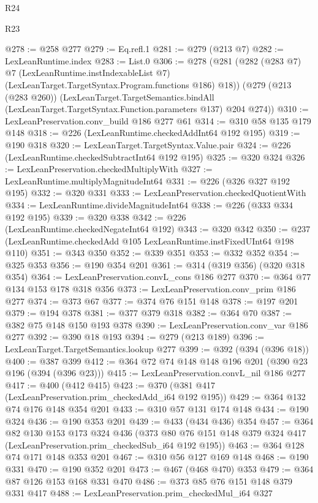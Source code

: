 \begin{lexlean}{R24}
\begin{lexlean}{R23}
\begin{coremodule}
{{{{{@278 := @258 @277
@279 := Eq.refl.{1}
@281 := @279 (@213 @7)
@282 := LexLeanRuntime.index
@283 := List.{0}
@306 := @278
    (@281
      (@282
        (@283 @7)
        @7
        (LexLeanRuntime.instIndexableList @7)
        (LexLeanTarget.TargetSyntax.Program.functions @186)
        @18))
    (@279
      (@213 (@283 @260))
      (LexLeanTarget.TargetSemantics.bindAll
        (LexLeanTarget.TargetSyntax.Function.parameters @137)
        @204
        @274))
@310 := LexLeanPreservation.conv_build @186 @277 @61
@314 := @310 @58 @135 @179 @148
@318 := @226 (LexLeanRuntime.checkedAddInt64 @192 @195)
@319 := @190 @318
@320 := LexLeanTarget.TargetSyntax.Value.pair
@324 := @226 (LexLeanRuntime.checkedSubtractInt64 @192 @195)
@325 := @320 @324
@326 := LexLeanPreservation.checkedMultiplyWith
@327 := LexLeanRuntime.multiplyMagnitudeInt64
@331 := @226 (@326 @327 @192 @195)
@332 := @320 @331
@333 := LexLeanPreservation.checkedQuotientWith
@334 := LexLeanRuntime.divideMagnitudeInt64
@338 := @226 (@333 @334 @192 @195)
@339 := @320 @338
@342 := @226 (LexLeanRuntime.checkedNegateInt64 @192)
@343 := @320 @342
@350 := @237 (LexLeanRuntime.checkedAdd @105 LexLeanRuntime.instFixedUInt64 @198 @110)
@351 := @343 @350
@352 := @339 @351
@353 := @332 @352
@354 := @325 @353
@356 := @190 @354 @201
@361 := @314 (@319 @356) (@320 @318 @354)
@364 := LexLeanPreservation.convL_cons @186 @277
@370 := @364 @77 @134 @153 @178 @318 @356
@373 := LexLeanPreservation.conv_prim @186 @277
@374 := @373 @67
@377 := @374 @76 @151 @148
@378 := @197 @201
@379 := @194 @378
@381 := @377 @379 @318
@382 := @364 @70
@387 := @382 @75 @148 @150 @193 @378
@390 := LexLeanPreservation.conv_var @186 @277
@392 := @390 @18 @193
@394 := @279 (@213 @189)
@396 := LexLeanTarget.TargetSemantics.lookup @277
@399 := @392 (@394 (@396 @18))
@400 := @387 @399
@412 := @364 @72 @74 @148 @148 @196 @201 (@390 @23 @196 (@394 (@396 @23)))
@415 := LexLeanPreservation.convL_nil @186 @277
@417 := @400 (@412 @415)
@423 := @370 (@381 @417 (LexLeanPreservation.prim_checkedAdd_i64 @192 @195))
@429 := @364 @132 @74 @176 @148 @354 @201
@433 := @310 @57 @131 @174 @148
@434 := @190 @324
@436 := @190 @353 @201
@439 := @433 (@434 @436) @354
@457 := @364
    @82
    @130
    @153
    @173
    @324
    @436
    (@373 @80 @76 @151 @148 @379 @324 @417 (LexLeanPreservation.prim_checkedSub_i64 @192 @195))
@463 := @364 @128 @74 @171 @148 @353 @201
@467 := @310 @56 @127 @169 @148
@468 := @190 @331
@470 := @190 @352 @201
@473 := @467 (@468 @470) @353
@479 := @364 @87 @126 @153 @168 @331 @470
@486 := @373 @85 @76 @151 @148 @379 @331 @417
@488 := LexLeanPreservation.prim_checkedMul_i64 @327
}}}}}
\end{coremodule}
\end{lexlean}
\end{lexlean}
